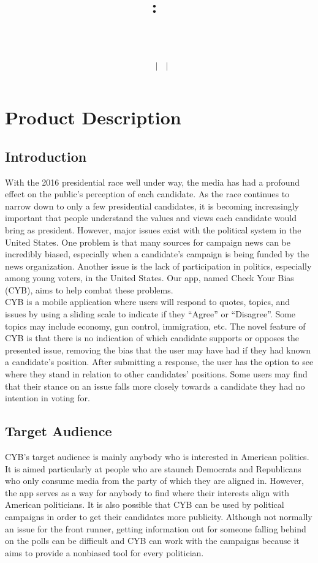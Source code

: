 \documentclass[11pt]{article}
\title{
    \vspace{2in}
    \textmd{\textbf{\hmwkClass:\ \hmwkTitle}}\\
    \vspace{0.1in}\large{\textit{\hmwkClassInstructor\ \hmwkClassTime}}\\
    \author{\textbf{\hmwkAuthorName\ $\vert$ \hmwkAuthorCSE\ $\vert$ \hmwkAuthorId}}
}
\date{}
\begin{document}
\section*{Product Description}

\subsection*{Introduction}

With the 2016 presidential race well under way, the media has had a profound effect on the public's perception of each candidate. As the race continues to narrow down to only a few presidential candidates, it is becoming increasingly important that people understand the values and views each candidate would bring as president. However, major issues exist with the political system in the United States. One problem is that many sources for campaign news can be incredibly biased, especially when a candidate's campaign is being funded by the news organization. Another issue is the lack of participation in politics, especially among young voters, in the United States. Our app, named Check Your Bias (CYB), aims to help combat these problems.\\

CYB is a mobile application where users will respond to quotes, topics, and issues by using a sliding scale to indicate if they ``Agree'' or ``Disagree''. Some topics may include economy, gun control, immigration, etc. The novel feature of CYB is that there is no indication of which candidate supports or opposes the presented issue, removing the bias that the user may have had if they had known a candidate's position. After submitting a response, the user has the option to see where they stand in relation to other candidates' positions. Some users may find that their stance on an issue falls more closely towards a candidate they had no intention in voting for.

\subsection*{Target Audience}

CYB's target audience is mainly anybody who is interested in American politics. It is aimed particularly at people who are staunch Democrats and Republicans who only consume media from the party of which they are aligned in. However, the app serves as a way for anybody to find where their interests align with American politicians. It is also possible that CYB can be used by political campaigns in order to get their candidates more publicity. Although not normally an issue for the front runner, getting information out for someone falling behind on the polls can be difficult and CYB can work with the campaigns because it aims to provide a nonbiased tool for every politician.
\end{document}
